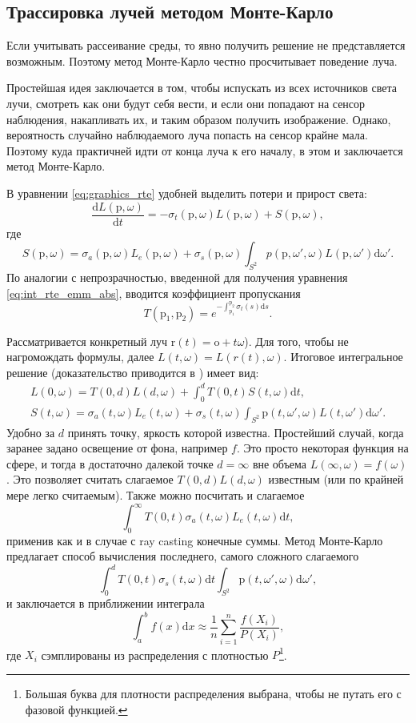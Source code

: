 \subsection{Трассировка лучей методом Монте-Карло}

Если учитывать рассеивание среды, то явно получить решение не представляется возможным. Поэтому метод Монте-Карло честно просчитывает поведение луча.

Простейшая идея заключается в том, чтобы испускать из всех источников света лучи, смотреть как они будут себя вести, и если они попадают на сенсор наблюдения, накапливать их, и таким образом получить изображение. Однако, вероятность случайно наблюдаемого луча попасть на сенсор крайне мала. Поэтому куда практичней идти от конца луча к его началу, в этом и заключается метод Монте-Карло.

В уравнении \ref{eq:graphics_rte} удобней выделить потери и прирост света:
%
\[
	\frac{\mathrm dL(\mathrm p, \omega)}{\mathrm dt} = 
	-\sigma_t(\mathrm p, \omega) L(\mathrm p, \omega) +
	S(\mathrm p, \omega),
\]
%
где
%
\[
	S(\mathrm p, \omega) =
	\sigma_a(\mathrm p, \omega) L_e(\mathrm p, \omega) + 
	\sigma_s(\mathrm p, \omega) \int_{S^2} p(\mathrm p, \omega', \omega) L(\mathrm p, \omega') \mathrm d\omega'.
\]
%
По аналогии с непрозрачностью, введенной для получения уравнения \ref{eq:int_rte_emm_abs}, вводится коэффициент пропускания
%
\[
	T(\mathrm p_1, \mathrm p_2) =
	e^{-\int_{\mathrm p_1}^{\mathrm p_2} \sigma_t(s) \mathrm ds}.
\]

Рассматривается конкретный луч $\mathrm r(t) = \mathrm o + t\omega$). Для того, чтобы не нагромождать формулы, далее $L(t, \omega)=L(r(t), \omega)$. Итоговое интегральное решение (доказательство приводится в \cite{max1995optical}) имеет вид:
%
\begin{align*}
	L(0, \omega) = T(0, d) L(d, \omega) + \int_0^d T(0, t) S(t, \omega) \mathrm dt, \\
	S(t, \omega) =
	\sigma_a(t, \omega) L_e(t, \omega) +
	\sigma_s(t, \omega) \int_{S^2} \mathrm p(t, \omega', \omega) L(t, \omega') \mathrm d\omega'.
\end{align*}
%
Удобно за $d$ принять точку, яркость которой известна. Простейший случай, когда заранее задано освещение от фона, например $f$. Это просто некоторая функция на сфере, и тогда в достаточно далекой точке $d=\infty$ вне объема $L(\infty, \omega)=f(\omega)$. Это позволяет считать слагаемое $T(0, d) L(d, \omega)$ известным (или по крайней мере легко считаемым). Также можно посчитать и слагаемое
%
\[
	\int_0^\infty T(0, t) \sigma_a(t, \omega) L_e(t, \omega) \mathrm dt,
\]
%
применив как и в случае с ray casting конечные суммы. Метод Монте-Карло предлагает способ вычисления последнего, самого сложного слагаемого
%
\begin{equation}
	\label{eq:scattering_integral}
	\int_0^d T(0, t) \sigma_s(t, \omega) \mathrm dt
	\int_{S^2} \mathrm p(t, \omega', \omega) \mathrm d\omega',
\end{equation}
%
и заключается в приближении интеграла
%
\[
	\int_a^b f(x) \mathrm dx \approx
	\frac1n \sum_{i=1}^n \frac{f(X_i)}{P(X_i)},
\]
%
где $X_i$ сэмплированы из распределения с плотностью $P$\footnote{Большая буква для плотности распределения выбрана, чтобы не путать его с фазовой функцией.}.

